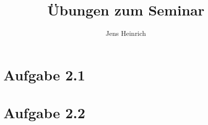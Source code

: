 \documentclass{article}
\title{\"Ubungen zum Seminar \boldfont{Kategorientheorie} }
\author{Jens Heinrich}
\begin{document}
\section*{Aufgabe 2.1}
	


\newpage	
\section*{Aufgabe 2.2}
	
	
\end{document}
